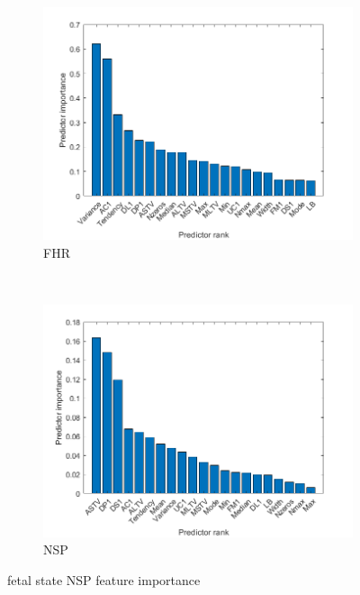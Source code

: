 \documentclass[11pt,a4paper]{article}
\begin{document}
\begin{figure}[htb]
  \centering
  \begin{subfigure}[b]{0.45\textwidth}
    \centering
    \includegraphics[width=\textwidth]{figures/feature_importance.png}
    \caption{FHR}
  \end{subfigure}
  ~
  \begin{subfigure}[b]{0.45\textwidth}
    \centering
    \includegraphics[width=\textwidth]{figures/feature_importance_NSP.png}
    \caption{NSP}
  \end{subfigure}
  \caption{fetal state NSP feature importance}
  \label{fig:FI}
\end{figure}
\end{document}
